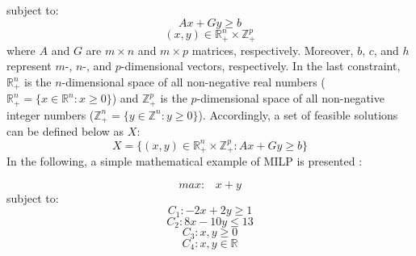     subject to:
    \begin{equation*}
        A x + G y \geq b
    \end{equation*}
    \begin{equation*}
        (x, y) \in \mathbb{R}^{n}_{+} \times \mathbb{Z}^{p}_{+}
    \end{equation*}
    where $A$ and $G$ are $m \times n$ and  $m \times p$ matrices, respectively. Moreover, $b$, $c$, and $h$ represent $m$-, $n$-, and $p$-dimensional vectors, respectively. In the last constraint, $\mathbb{R}^{n}_{+}$ is the $n$-dimensional space of all non-negative real numbers ($\mathbb{R}^{n}_{+} = \{ x \in \mathbb{R}^{n} : x\geq 0 \}$) and $ \mathbb{Z}^{p}_{+}$ is the $p$-dimensional space of all non-negative integer numbers ($\mathbb{Z}^{n}_{+} = \{ y \in \mathbb{Z}^{n} : y\geq 0 \}$). Accordingly, a set of feasible solutions can be defined below as $X$:
    \begin{equation*}
        X = \{ (x, y) \in \mathbb{R}^{n}_{+} \times \mathbb{Z}^{p}_{+} :  A x + G y \geq b\}
    \end{equation*}
    In the following, a simple mathematical example of MILP is presented :
    
    \begin{equation*}
        max:\;\;\;  x + y
    \end{equation*}
    subject to:
    \begin{equation*}
           C_1 : -2x + 2y \geq 1
    \end{equation*}
    \begin{equation*}
        C_2 :  8x - 10y \leq 13
    \end{equation*}
    \begin{equation*}
         C_3 : x, y \geq 0 
    \end{equation*}
    \begin{equation*}
         C_4 : x, y \in \mathbb{R}  
    \end{equation*}
      
